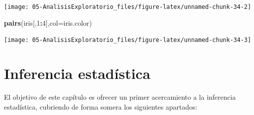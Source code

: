 \documentclass[]{book}
\newenvironment{Shaded}{\begin{snugshade}}{\end{snugshade}}
\newcommand{\DataTypeTok}[1]{\textcolor[rgb]{0.13,0.29,0.53}{#1}}
\newcommand{\DecValTok}[1]{\textcolor[rgb]{0.00,0.00,0.81}{#1}}
\newcommand{\KeywordTok}[1]{\textcolor[rgb]{0.13,0.29,0.53}{\textbf{#1}}}
\newcommand{\NormalTok}[1]{#1}
\newcommand{\OperatorTok}[1]{\textcolor[rgb]{0.81,0.36,0.00}{\textbf{#1}}}
\newcommand{\StringTok}[1]{\textcolor[rgb]{0.31,0.60,0.02}{#1}}
\begin{document}
\begin{Shaded}
\end{Shaded}

\begin{center}\texttt{[image: 05-AnalisisExploratorio\_files/figure-latex/unnamed-chunk-34-2]} \end{center}

\begin{Shaded}
\begin{Highlighting}[]
\KeywordTok{pairs}\NormalTok{(iris[,}\DecValTok{1}\OperatorTok{:}\DecValTok{4}\NormalTok{],}\DataTypeTok{col=}\NormalTok{iris.color)}
\end{Highlighting}
\end{Shaded}

\begin{center}\texttt{[image: 05-AnalisisExploratorio\_files/figure-latex/unnamed-chunk-34-3]} \end{center}

\hypertarget{inferencia-estadistica}{%
\chapter{Inferencia estadística}\label{inferencia-estadistica}}

El objetivo de este capítulo es ofrecer un primer acercamiento a la inferencia estadística,
cubriendo de forma somera los siguientes apartados:
\end{document}
